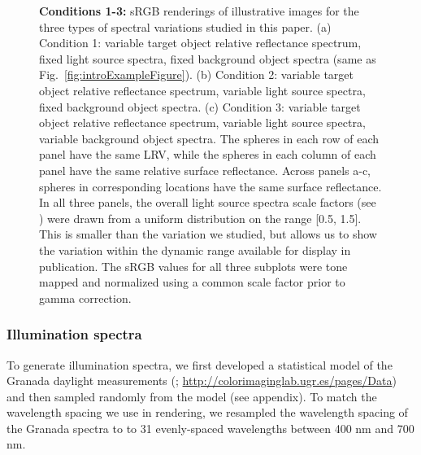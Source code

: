 \documentclass{jov}
\begin{document}
\begin{figure}
\begin{subfigure}{0.33 \textwidth}
        \label{fig:allSpectraVarying}
    \end{subfigure}    
    \caption{{\bf Conditions 1-3:} sRGB renderings of illustrative images for the three types of spectral variations studied in this paper. (a) Condition 1: variable target object relative reflectance spectrum, fixed light source spectra, fixed background object spectra (same as Fig.~\ref{fig:introExampleFigure}). 
(b) Condition 2: variable target object relative reflectance spectrum, variable light source spectra, fixed background object spectra. (c) Condition 3: variable target object relative reflectance spectrum, variable light source spectra, variable background object spectra. The spheres in each row of each panel have the same LRV, while the spheres in each column of each panel have the same relative surface reflectance.  Across panels a-c, spheres in corresponding locations have the same surface reflectance. In all three panels, the overall light source spectra scale factors (see ) were drawn from a uniform distribution on the range [0.5, 1.5]. This is smaller than the variation we studied, but allows us to show the variation within the dynamic range available for display in publication. The sRGB values for all three subplots were tone mapped and normalized using a common scale factor prior to gamma correction.} 
\label{fig:studiedCases}
\end{figure}

\subsubsection{Illumination spectra}
To generate illumination spectra, we first developed a statistical model of the Granada daylight measurements (; \href{http://colorimaginglab.ugr.es/pages/Data}{http://colorimaginglab.ugr.es/pages/Data}) and then sampled randomly from the model (see appendix).
To match the wavelength spacing we use in rendering, we resampled the wavelength spacing of the Granada spectra to
to 31 evenly-spaced wavelengths between 400 nm and 700 nm.
\end{document}
